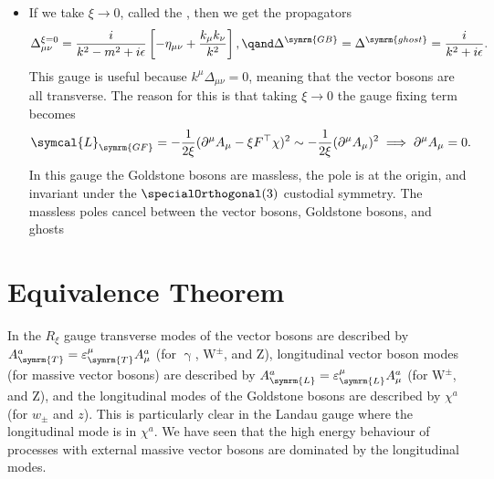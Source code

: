 \documentclass[fleqn]{NotesClass}
\newcommand{\Pparticle}[1]{\mathrm{#1}}
\newcommand{\Pphoton}{\ensuremath{\upgamma}}
\newcommand{\PZ}{\ensuremath{\Pparticle{Z}}}
\newcommand{\PWpm}{\ensuremath{\Pparticle{W}^{\pm}}}
\newcommand{\lagrangianDensity}{\symcal{L}}
\newcommand{\minkowskiMetric}{\eta}
\newcommand{\trans}{\top}
\begin{document}
\begin{itemize}
        \item If we take \(\xi \to 0\), called the , then we get the propagators
        \begin{equation}
            \Delta_{\mu\nu}^{\xi = 0} = \frac{i}{k^2 - m^2 + i\epsilon} \left[ -\minkowskiMetric_{\mu\nu} + \frac{k_\mu k_\nu}{k^2} \right], \qand \Delta^{\symrm{GB}} = \Delta^{\symrm{ghost}} = \frac{i}{k^2 + i\epsilon}.
        \end{equation}
        This gauge is useful because \(k^\mu \Delta_{\mu\nu} = 0\), meaning that the vector bosons are all transverse.
        The reason for this is that taking \(\xi \to 0\) the gauge fixing term becomes
        \begin{equation}
            \lagrangianDensity_{\symrm{GF}} = -\frac{1}{2\xi}(\partial^\mu A_\mu - \xi F^{\trans}\chi)^2 \sim -\frac{1}{2\xi}(\partial^\mu A_\mu)^2 \implies \partial^\mu A_\mu = 0.
        \end{equation}
        In this gauge the Goldstone bosons are massless, the pole is at the origin, and invariant under the \(\specialOrthogonal(3)\) custodial symmetry.
        The massless poles cancel between the vector bosons, Goldstone bosons, and ghosts
    \end{itemize}
    
    \section{Equivalence Theorem}
    In the \(R_\xi\) gauge transverse modes of the vector bosons are described by \(A^a_{\symrm{T}} = \varepsilon^\mu_{\symrm{T}}A^a_\mu\) (for \Pphoton{}, \PWpm{}, and \PZ{}), longitudinal vector boson modes (for massive vector bosons) are described by \(A^a_{\symrm{L}} = \varepsilon^\mu_{\symrm{L}}A^a_\mu\) (for \PWpm{}, and \PZ{}), and the longitudinal modes of the Goldstone bosons are described by \(\chi^a\) (for \(w_{\pm}\) and \(z\)).
    This is particularly clear in the Landau gauge where the longitudinal mode is in \(\chi^a\).
    We have seen that the high energy behaviour of processes with external massive vector bosons are dominated by the longitudinal modes.
    
\end{document}
